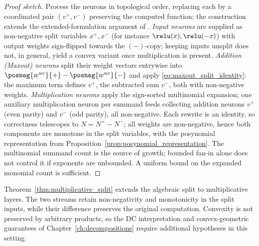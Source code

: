 \begin{proof}[Proof sketch]
Process the neurons in topological order, replacing each by a coordinated pair $(v^{+}, v^{-})$ preserving the computed function; the construction extends the extended-formulation argument of \textcite{hertrich2025neuralnetworksvirtualextended}. \emph{Input neurons} are supplied as non-negative split variables $x^+,x^-$ (for instance $\relu(x),\relu(-x)$) with output weights sign-flipped towards the $(-)$-copy; keeping inputs unsplit does not, in general, yield a convex variant once multiplication is present. \emph{Addition (Maxout) neurons} split their weight vectors entrywise into $\posneg{w^{uv}}{+} - \posneg{w^{uv}}{-}$ and apply \eqref{eq:maxout_split_identity}: the maximum term defines $v^{+}$, the subtracted sum $v^{-}$, both with non-negative weights. \emph{Multiplication neurons} apply the sign-sorted multinomial expansion; one auxiliary multiplication neuron per summand feeds collecting addition neurons $v^{+}$ (even parity) and $v^{-}$ (odd parity), all non-negative. Each rewrite is an identity, so correctness telescopes to $N = N^{+} - N^{-}$; all weights are non-negative, hence both components are monotone in the split variables, with the posynomial representation from Proposition~\ref{prop:posynomial_representation}. The multinomial summand count is the source of growth; bounded fan-in alone does not control it if exponents are unbounded. A uniform bound on the expanded monomial count is sufficient.
\end{proof}

Theorem~\ref{thm:multiplicative_split} extends the algebraic split to multiplicative layers. The two streams retain non-negativity and monotonicity in the split inputs, while their difference preserves the original computation. Convexity is not preserved by arbitrary products, so the DC interpretation and convex-geometric guarantees of Chapter~\ref{ch:decompositions} require additional hypotheses in this setting.

